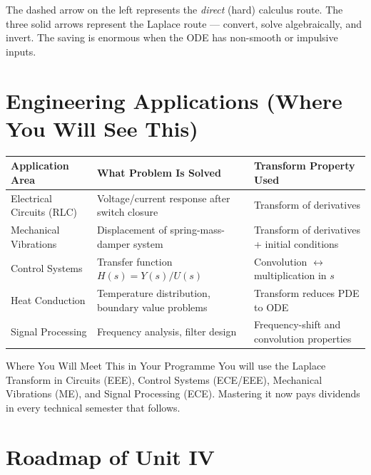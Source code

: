 \documentclass[12pt,a4paper]{article}
\begin{document}
\medskip
The dashed arrow on the left represents the \emph{direct} (hard) calculus
route.  The three solid arrows represent the Laplace route --- convert,
solve algebraically, and invert.  The saving is enormous when the ODE has
non-smooth or impulsive inputs.

\section{Engineering Applications (Where You Will See This)}

\begin{center}
\begin{tabular}{@{}lll@{}}
\toprule
\textbf{Application Area} & \textbf{What Problem Is Solved} & \textbf{Transform Property Used} \\
\midrule
Electrical Circuits (RLC) &
  Voltage/current response after switch closure &
  Transform of derivatives \\
Mechanical Vibrations &
  Displacement of spring-mass-damper system &
  Transform of derivatives + initial conditions \\
Control Systems &
  Transfer function $H(s) = Y(s)/U(s)$ &
  Convolution $\leftrightarrow$ multiplication in $s$ \\
Heat Conduction &
  Temperature distribution, boundary value problems &
  Transform reduces PDE to ODE \\
Signal Processing &
  Frequency analysis, filter design &
  Frequency-shift and convolution properties \\
\bottomrule
\end{tabular}
\end{center}

\begin{learnbox}{Where You Will Meet This in Your Programme}
You will use the Laplace Transform in Circuits (EEE), Control Systems (ECE/EEE),
Mechanical Vibrations (ME), and Signal Processing (ECE).  Mastering it now
pays dividends in every technical semester that follows.
\end{learnbox}

\section{Roadmap of Unit IV}
\end{document}
